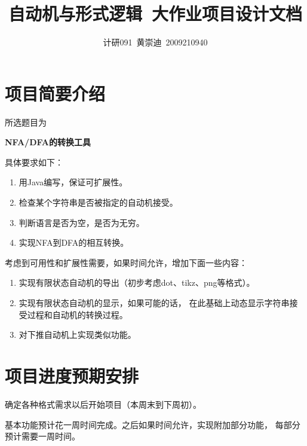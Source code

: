 \documentclass[12pt,a4paper]{article}
\author{计研091~黄崇迪~2009210940}
\title{自动机与形式逻辑~大作业项目设计文档}
\begin{document}
\begin{CJK}{UTF8}{hei}
    \maketitle
\end{CJK}
\begin{CJK}{UTF8}{song}
    \tableofcontents
    \newpage
    
    \section{项目简要介绍}
    所选题目为\begin{CJK}{UTF8}{hei}\textbf{NFA/DFA的转换工具}\end{CJK}
    
    具体要求如下：
    \begin{enumerate}
    \item 用Java编写，保证可扩展性。
    \item 检查某个字符串是否被指定的自动机接受。
    \item 判断语言是否为空，是否为无穷。
    \item 实现NFA到DFA的相互转换。
    \end{enumerate}
    
    考虑到可用性和扩展性需要，如果时间允许，增加下面一些内容：
    \begin{enumerate}
    \item 实现有限状态自动机的导出（初步考虑dot、tikz、png等格式）。
    \item 实现有限状态自动机的显示，如果可能的话，
        在此基础上动态显示字符串接受过程和自动机的转换过程。
    \item 对下推自动机上实现类似功能。
    \end{enumerate}
    
    \section{项目进度预期安排}
    确定各种格式需求以后开始项目（本周末到下周初）。
    
    基本功能预计花一周时间完成。之后如果时间允许，实现附加部分功能，
    每部分预计需要一周时间。
    

\end{CJK}
\end{document}
